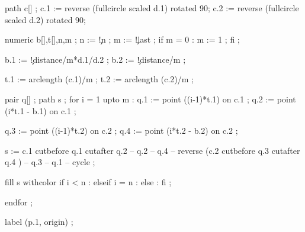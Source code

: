   path c[] ;
  c.1 := reverse (fullcircle scaled d.1) rotated 90;
  c.2 := reverse (fullcircle scaled d.2) rotated 90;

  numeric b[],t[],n,m ;
  n := \visualcounterparameter\c!n ;
  m := \visualcounterparameter\c!last ;
  if m = 0 : m := 1 ; fi ;

  b.1 := \visualcounterparameter\c!distance/m*d.1/d.2 ;
  b.2 := \visualcounterparameter\c!distance/m ;

  t.1 := arclength (c.1)/m ;
  t.2 := arclength (c.2)/m ;

  pair q[] ;
  path s ;
  for i = 1 upto m : 
    q.1 := point ((i-1)*t.1)        on c.1 ;
    q.2 := point (i*t.1 - b.1)  on c.1 ;

    q.3 := point ((i-1)*t.2)        on c.2 ;
    q.4 := point (i*t.2 - b.2)  on c.2 ;

    s := c.1 cutbefore q.1 cutafter q.2 -- q.2 -- q.4
       -- reverse (c.2 cutbefore q.3 cutafter q.4 ) -- q.3 -- q.1 
       -- cycle ;

    fill s withcolor 
      if i < n     :  
      elseif i = n : 
      else         : 
      fi ;

  endfor ;


  label (p.1, origin) ;


\stopuseMPgraphic

\protect
